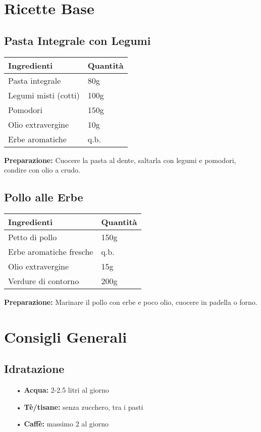 \documentclass[11pt,a4paper]{article}
\begin{document}
\newpage

\section{Ricette Base}

\subsection{Pasta Integrale con Legumi}
\begin{tabular}{ll}
\toprule
\textbf{Ingredienti} & \textbf{Quantità} \\
\midrule
Pasta integrale & 80g \\
Legumi misti (cotti) & 100g \\
Pomodori & 150g \\
Olio extravergine & 10g \\
Erbe aromatiche & q.b. \\
\bottomrule
\end{tabular}

\textbf{Preparazione:} Cuocere la pasta al dente, saltarla con legumi e pomodori, condire con olio a crudo.

\subsection{Pollo alle Erbe}
\begin{tabular}{ll}
\toprule
\textbf{Ingredienti} & \textbf{Quantità} \\
\midrule
Petto di pollo & 150g \\
Erbe aromatiche fresche & q.b. \\
Olio extravergine & 15g \\
Verdure di contorno & 200g \\
\bottomrule
\end{tabular}

\textbf{Preparazione:} Marinare il pollo con erbe e poco olio, cuocere in padella o forno.

\newpage

\section{Consigli Generali}

\subsection{Idratazione}
\begin{itemize}[leftmargin=*]
\item[\textcolor{maincolor}{•}] \textbf{Acqua:} 2-2.5 litri al giorno
\item[\textcolor{maincolor}{•}] \textbf{Tè/tisane:} senza zucchero, tra i pasti
\item[\textcolor{maincolor}{•}] \textbf{Caffè:} massimo 2 al giorno
\end{itemize}
\end{document}
